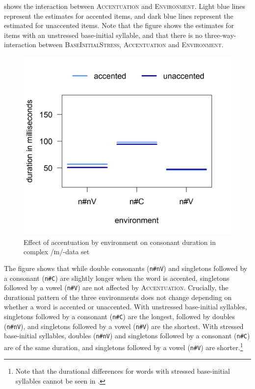  	
 

 shows the interaction between \textsc{Accentuation} and \textsc{Environment}. Light blue lines represent the estimates for accented items, and dark blue lines represent the estimated for unaccented items. Note that the figure shows the estimates for items with an unstressed base-initial syllable, and that there is no three-way-interaction between \textsc{BaseInitialStress}, \textsc{Accentuation} and \textsc{Environment}. 


	


	\begin{figure}[h!]
		\centering
		\includegraphics [scale=0.5] {images/Experiment/InModelInterEnvAcc}
		\caption{Effect of accentuation by environment on consonant duration in complex /ɪn/-data set}
		\label{fig:Env Acc In experiment}
	\end{figure}






The figure shows that while double consonants (\texttt{n\#nV}) and singletons followed by a consonant (\texttt{n\#C}) are slightly longer when the word is accented, singletons followed by a vowel (\texttt{n\#V}) are not affected by \textsc{Accentuation}. Crucially, 
the durational pattern of the three environments does not change depending on whether a word is accented or unaccented. 
With unstressed base-initial syllables, singletons followed by a consonant (\texttt{n\#C}) are the longest, followed by doubles (\texttt{n\#nV}), and singletons followed by a vowel (\texttt{n\#V}) are the shortest.
With stressed base-initial syllables, doubles (\texttt{n\#nV}) and singletons followed by a consonant (\texttt{n\#C}) are of the same duration, and singletons followed by a vowel (\texttt{n\#V}) are shorter.\footnote{Note that the durational differences for words with stressed base-initial syllables cannot be seen in .}


